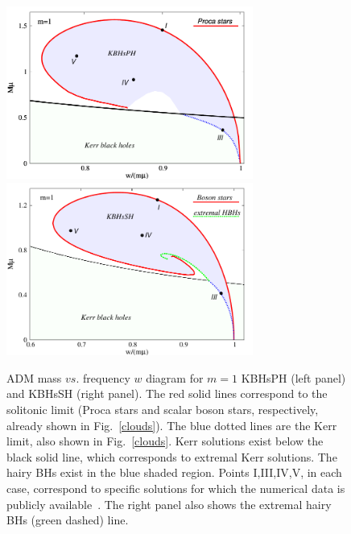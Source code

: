 %
\begin{figure}[h!]
  \begin{center}
    \includegraphics[width=8.1cm]{papers/Proca/BH-w-M-with-points.pdf}
      \includegraphics[width=8.1cm]{papers/Proca/scalar-BH-w-M.pdf}
  \end{center}
  \caption{ADM mass $vs.$ frequency $w$ diagram for $m=1$ KBHsPH (left panel) and KBHsSH (right panel). The red solid lines correspond to the solitonic limit (Proca stars and scalar boson stars, respectively, already shown in Fig.~\ref{clouds}). The blue dotted lines are the Kerr limit, also shown in Fig.~\ref{clouds}. Kerr solutions exist below the black solid line, which corresponds to extremal Kerr solutions. The hairy BHs exist in the blue shaded region. Points I,III,IV,V, in each case, correspond to specific solutions for which the numerical data is publicly available~\cite{datakbhph,datakbhsh}. The right panel also shows the extremal hairy BHs (green dashed) line.}
  \label{figdomain}
\end{figure}
%


